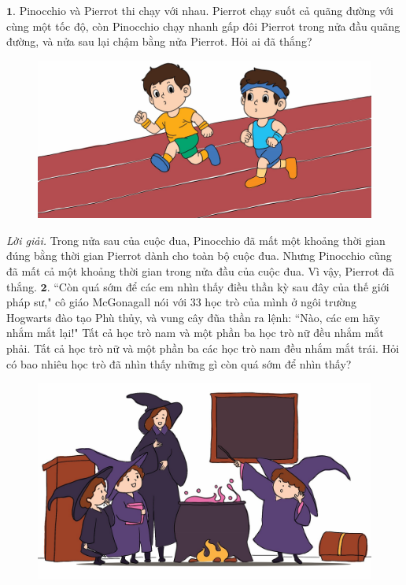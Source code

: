 \begin{multicols}{2}
	$\pmb{1.}$	Pinocchio và Pierrot thi chạy với nhau. Pierrot chạy suốt cả quãng đường với cùng một tốc độ, còn Pinocchio chạy nhanh gấp đôi Pierrot trong nửa đầu quãng đường, và nửa sau lại chậm bằng nửa Pierrot. Hỏi ai đã thắng?
	\begin{figure}[H]
		\centering
		\vspace*{-5pt}
		\captionsetup{labelformat= empty, justification=centering}
		\includegraphics[width=1\linewidth]{Pi4_bai1}
		\vspace*{-15pt}
	\end{figure}
	\textit{Lời giải.} Trong nửa sau của cuộc đua, Pinocchio đã mất một khoảng thời gian đúng bằng thời gian Pierrot dành cho toàn bộ cuộc đua. Nhưng Pinocchio cũng đã mất cả một khoảng thời gian trong nửa đầu của cuộc đua. Vì vậy, Pierrot đã thắng. 
	\vskip 0.1cm
	$\pmb{2.}$ ``Còn quá sớm để các em nhìn thấy điều thần kỳ sau đây của thế giới pháp sư," cô giáo McGonagall  nói với $33$ học trò của mình ở ngôi trường Hogwarts đào tạo Phù thủy, và vung cây đũa thần ra lệnh: ``Nào, các em hãy nhắm mắt lại!" Tất cả học trò nam và một phần ba học trò nữ đều nhắm mắt phải. Tất cả học trò nữ và một phần ba các học trò nam đều nhắm mắt trái. Hỏi có bao nhiêu học trò đã nhìn thấy những gì còn quá sớm để nhìn thấy?
	\begin{figure}[H]
		\centering
		\vspace*{-10pt}
		\captionsetup{labelformat= empty, justification=centering}
		\includegraphics[width=1\linewidth]{Pi4_bai2}

\end{figure}
\end{multicols}
